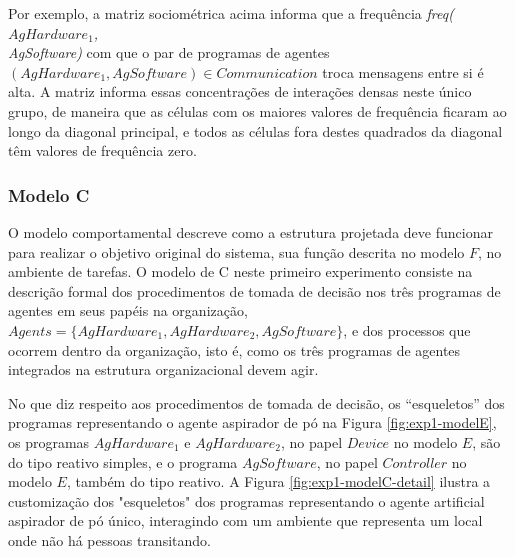     Por exemplo, a matriz sociométrica acima informa que a frequência \emph{freq($AgHardware_1$, \\AgSoftware)} com que o par de programas de agentes $(AgHardware_1, AgSoftware) \in Communication$ troca mensagens entre si é alta. A matriz informa essas concentrações de interações densas neste único grupo, de maneira que as células com os maiores valores de frequência ficaram ao longo da diagonal principal, e todos as células fora destes quadrados da diagonal têm valores de frequência zero.

\subsubsection{Modelo C}

O modelo comportamental descreve como a estrutura projetada deve funcionar para realizar o objetivo original do sistema, sua função descrita no modelo $F$, no ambiente de tarefas. O modelo de C neste primeiro experimento consiste na descrição formal dos procedimentos de tomada de decisão nos três programas de agentes em seus papéis na organização, $Agents = \{AgHardware_1, AgHardware_2, AgSoftware\}$, e dos processos que ocorrem dentro da organização, isto é, como os três programas de agentes integrados na estrutura organizacional devem agir.

No que diz respeito aos procedimentos de tomada de decisão, os “esqueletos” dos programas representando o agente aspirador de pó na Figura \ref{fig:exp1-modelE}, os programas $AgHardware_1$ e $AgHardware_2$, no papel $Device$ no modelo $E$, são do tipo reativo simples, e o programa $AgSoftware$, no papel $Controller$ no modelo $E$, também do tipo reativo. A Figura \ref{fig:exp1-modelC-detail} ilustra a customização dos "esqueletos" dos programas representando o agente artificial aspirador de pó único, interagindo com um ambiente que representa um local onde não há pessoas transitando.

\begin{figure}[h!]
    \centering
\end{figure}

